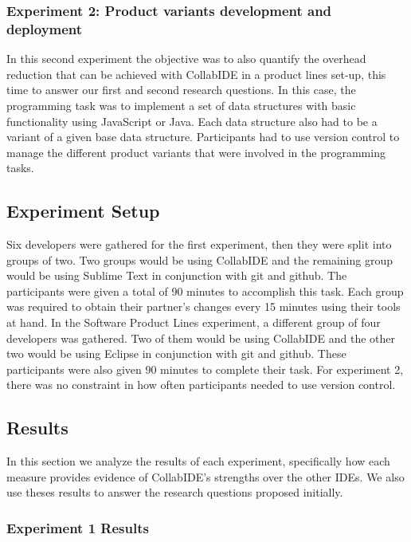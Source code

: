 \subsubsection{Experiment 2: Product variants development and deployment}
In this second experiment the objective was to also quantify the overhead reduction that can be achieved with CollabIDE in a product lines set-up, this time to answer our first and second research questions. In this case, the programming task was to implement a set of data structures with basic functionality using JavaScript  or Java. Each data structure also had to be a variant of a given base data structure. Participants had to use version control to manage the different product variants that were involved in the programming tasks.

\subsection{Experiment Setup}

Six developers were gathered for the first experiment, then they were split into groups of two. Two groups would be using CollabIDE and the remaining group would be using Sublime Text in conjunction with git and github. The participants were given a total of 90 minutes to accomplish this task. Each group was required to obtain their partner’s changes every 15 minutes using their tools at hand. In the Software Product Lines experiment, a different group of four developers was gathered. Two of them would be using CollabIDE and the other two would be using Eclipse in conjunction with git and github. These participants were also given 90 minutes to complete their task. For experiment 2, there was no constraint in how often participants needed to use version control.
	
\subsection{Results}

In this section we analyze the results of each experiment, specifically how each measure provides evidence of CollabIDE's strengths over the other IDEs. We also use theses results to answer the research questions proposed initially.

\subsubsection{Experiment 1 Results}

